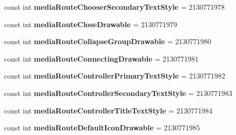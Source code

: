 \begin{DoxyCompactItemize}
\item 
\mbox{\label{class_pinned_app_1_1_droid_1_1_resource_1_1_attribute_a0bb0a5d3f4d2b8127fc25a22aae51c40}} 
const int {\bfseries media\+Route\+Chooser\+Secondary\+Text\+Style} = 2130771978
\item 
\mbox{\label{class_pinned_app_1_1_droid_1_1_resource_1_1_attribute_a8b614910b1c86da590be0d977c1c37b3}} 
const int {\bfseries media\+Route\+Close\+Drawable} = 2130771979
\item 
\mbox{\label{class_pinned_app_1_1_droid_1_1_resource_1_1_attribute_a5d07a47dbaf2eb7b924f88137c75db12}} 
const int {\bfseries media\+Route\+Collapse\+Group\+Drawable} = 2130771980
\item 
\mbox{\label{class_pinned_app_1_1_droid_1_1_resource_1_1_attribute_abfea3c96fa7723ea5dc21de731282205}} 
const int {\bfseries media\+Route\+Connecting\+Drawable} = 2130771981
\item 
\mbox{\label{class_pinned_app_1_1_droid_1_1_resource_1_1_attribute_a7d15dce0d73056db93851dfcf8a7addc}} 
const int {\bfseries media\+Route\+Controller\+Primary\+Text\+Style} = 2130771982
\item 
\mbox{\label{class_pinned_app_1_1_droid_1_1_resource_1_1_attribute_a7a19ac43f715df7137b613830d66f11f}} 
const int {\bfseries media\+Route\+Controller\+Secondary\+Text\+Style} = 2130771983
\item 
\mbox{\label{class_pinned_app_1_1_droid_1_1_resource_1_1_attribute_a13681aea02c9e1e242d7ac57680e2657}} 
const int {\bfseries media\+Route\+Controller\+Title\+Text\+Style} = 2130771984
\item 
\mbox{\label{class_pinned_app_1_1_droid_1_1_resource_1_1_attribute_a10a92431f54b69e1ab9409ebeae3a2c5}} 
const int {\bfseries media\+Route\+Default\+Icon\+Drawable} = 2130771985

\end{DoxyCompactItemize}
